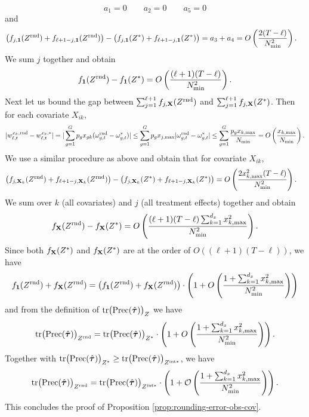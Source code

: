 		\[ a_1 = 0 \qquad a_2 = 0 \qquad  a_5 = 0 \]
		and 
        \begin{align*}
		    & \big(f_{j,\bm{1}}(Z^{\textnormal{rnd}})+f_{\ell+1-j,\bm{1}}(Z^{\textnormal{rnd}}) \big) - \big(f_{j,\bm{1}}(Z^\ast)+f_{\ell+1-j,\bm{1}}(Z^\ast) \big) = a_3 + a_4 = O\left(\frac{2 (T-\ell)}{N^2_{\min}} \right).
		\end{align*}
		We sum $j$ together and obtain
		\[ f_{\bm{1}}(Z^{\textnormal{rnd}}) - f_{\bm{1}}(Z^\ast) = O\left(\frac{(\ell+1) (T-\ell)}{N^2_{\min}} \right). \]
		Next let us bound the gap between $\sum_{j = 1}^{\ell+1} f_{j,\mathbf{X}}(Z^{\textnormal{rnd}})$ and $\sum_{j = 1}^{\ell+1} f_{j,\mathbf{X}}(Z^\ast)$. Then for each covariate $X_{ik}$, 
				\[|w^{x_k,\textnormal{rnd}}_{\ell,t} - w^{x_k,\ast}_{\ell,t}| = |\sum_{g = 1}^G p_g x_{gk} (\omega^{\textnormal{rnd}}_{g,t} - \omega^\ast_{g,t}) | \leq \sum_{g = 1}^G p_g x_{j,\max} |\omega^{\textnormal{rnd}}_{g,t} -\omega^\ast_{g,t}|  \leq \sum_{g = 1}^G \frac{p_g x_{k,\max}}{N_{\min}} = O\left(\frac{x_{k,\max}}{N_{\min}} \right). \]
				We use a similar procedure as above and obtain that for covariate $X_{ik}$, 
				\begin{align*}
		    & \big(f_{j,\mathbf{X}_{k}}(Z^{\textnormal{rnd}})+f_{\ell+1-j,\mathbf{X}_{k}}(Z^{\textnormal{rnd}}) \big) - \big(f_{j,\mathbf{X}_{k}}(Z^\ast)+f_{\ell+1-j,\mathbf{X}_{k}}(Z^\ast) \big)  = O\left(\frac{2 x_{k,\max}^2 (T-\ell)}{N^2_{\min}} \right).
		\end{align*}
		We sum over $k$ (all covariates) and $j$ (all treatment effects) together and obtain
		\[  f_{\mathbf{X}}(Z^{\textnormal{rnd}}) - f_{\mathbf{X}}(Z^\ast) = O\left(\frac{(\ell+1) (T-\ell) \sum_{k=1}^{d_x} x_{k,\max}^2}{N^2_{\min}} \right). \]
		Since both $f_{\mathbf{X}}(Z^\ast)$ and $ f_{\mathbf{X}}(Z^\ast)$ are at the order of $O((\ell+1) (T-\ell))$, we have 
		\begin{align*}
		   f_{\bm{1}}(Z^{\textnormal{rnd}})+  f_{\mathbf{X}}(Z^{\textnormal{rnd}}) = \left(  f_{\bm{1}}(Z^{\textnormal{rnd}})+  f_{\mathbf{X}}(Z^{\textnormal{rnd}})\right) \cdot\left(1+ O\left(\frac{1+ \sum_{k=1}^{d_x} x_{k,\max}^2}{N^2_{\min}} \right) \right)
		\end{align*}
		and from the definition of $\mathrm{tr} \big(\mathrm{Prec}(\hat{\bm{\tau}})  \big)_{Z} $ we have 
		\[ \mathrm{tr} \big(\mathrm{Prec}(\hat{\bm{\tau}})  \big)_{Z^{\textnormal{rnd}}} = \mathrm{tr} \big(\mathrm{Prec}(\hat{\bm{\tau}})  \big)_{Z^\ast}  \cdot\left(1+ O\left(\frac{1+ \sum_{k=1}^{d_x} x_{k,\max}^2}{N^2_{\min}} \right) \right).\]
		Together with $\mathrm{tr} \big(\mathrm{Prec}(\hat{\bm{\tau}})  \big)_{Z^\ast}  \geq \mathrm{tr} \big(\mathrm{Prec}(\hat{\bm{\tau}})  \big)_{Z^{\mathrm{int}\ast}}$, we have
		\[ \mathrm{tr} \big(\mathrm{Prec}(\hat{\bm{\tau}})  \big)_{Z^{\textnormal{rnd}}} = \mathrm{tr} \big(\mathrm{Prec}(\hat{\bm{\tau}})  \big)_{Z^{\mathrm{int}\ast}}  \cdot\left(1+ \mathcal{O}\left(\frac{1+ \sum_{k=1}^{d_x} x_{k,\max}^2}{N^2_{\min}} \right) \right).\]
  This concludes the proof of Proposition \ref{prop:rounding-error-obs-cov}.
\Halmos
		\endproof
		
		
